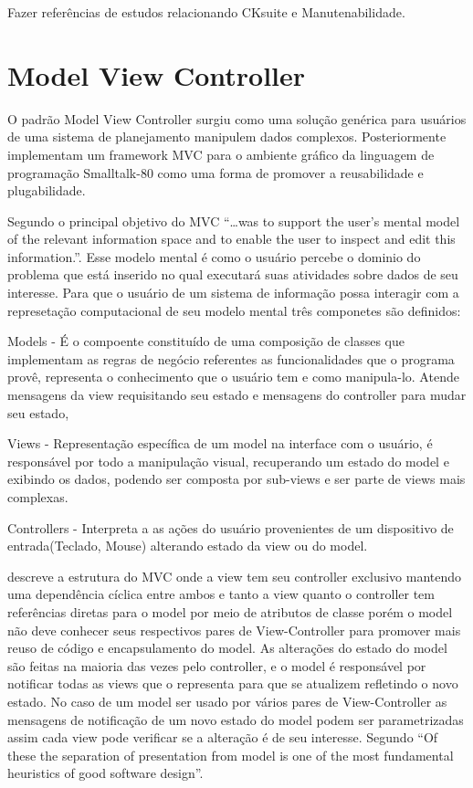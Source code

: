 Fazer referências de estudos relacionando CKsuite e Manutenabilidade.



\section{Model View Controller}

O padrão Model View Controller surgiu como uma solução genérica para usuários
de uma sistema de planejamento manipulem dados complexos.
Posteriormente  implementam um framework MVC para o
ambiente gráfico da linguagem de programação Smalltalk-80 como uma forma de
promover a reusabilidade e plugabilidade.

Segundo  o principal objetivo do MVC ``\ldots was to
support the user's mental model of the relevant information space and to enable
the user to inspect and edit this information.''. Esse modelo mental é como o
usuário percebe o dominio do problema que está inserido no qual executará suas
atividades sobre dados de seu interesse. Para que o usuário de um sistema de
informação possa interagir com a represetação computacional  de seu modelo
mental três componetes são definidos:

Models - É o compoente constituído de uma composição de classes que implementam
as regras de negócio referentes as funcionalidades que o programa provê,
representa o  conhecimento que o usuário tem e como manipula-lo. Atende
mensagens da view requisitando seu estado e mensagens do controller para mudar
seu estado,

Views - Representação específica de um model na interface com o usuário, é 
responsável por todo a manipulação visual, recuperando um estado do model e
exibindo os dados, podendo ser composta por sub-views e ser parte de views mais
complexas.

Controllers - Interpreta a as ações do usuário provenientes de um dispositivo de
entrada(Teclado, Mouse) alterando estado da view ou do model.




 descreve a estrutura do MVC onde a view tem seu
controller exclusivo mantendo uma dependência cíclica entre ambos e tanto a view
quanto o controller tem referências diretas para o model por meio de atributos
de classe porém o model não deve conhecer seus respectivos pares de
View-Controller para promover mais reuso de código e encapsulamento do model. As
alterações do estado do model são feitas na maioria das vezes pelo controller, e
o model é responsável por notificar todas as views que o representa para que
se atualizem refletindo o novo estado. No caso de um model ser usado por vários
pares de View-Controller as mensagens de notificação de um novo estado do model
podem ser parametrizadas assim cada view pode verificar se a alteração é de seu
interesse. Segundo  ``Of these the separation of presentation
from model is one of the most fundamental heuristics of good software design''.

